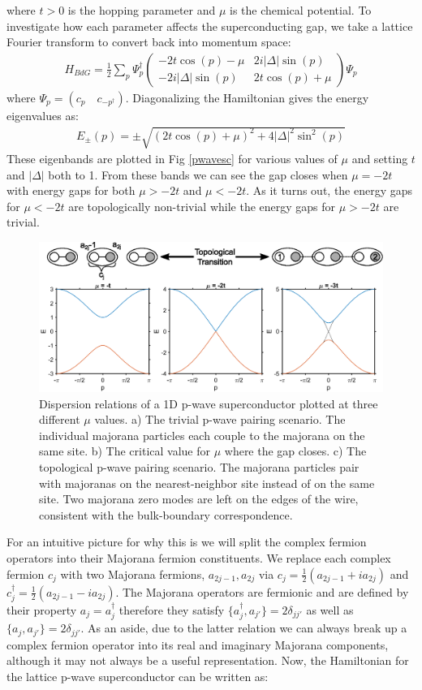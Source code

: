 where $t>0$ is the hopping parameter and $\mu$ is the chemical potential. To investigate how each parameter affects the superconducting gap, we take a lattice Fourier transform to convert back into momentum space:
\begin{align}
	H_{BdG} = \frac{1}{2}\sum_{p}\Psi_{p}^{\dagger}
	\begin{pmatrix}
		-2t\cos(p)-\mu & 2i|\Delta|\sin(p)\\
		-2i|\Delta|\sin(p) & 2t\cos(p)+\mu
	\end{pmatrix}
	\Psi_{p}
\end{align}
where $\Psi_{p}=(c_{p}\quad c_{-p^{\dagger}})$. Diagonalizing the Hamiltonian gives the energy eigenvalues as:
\begin{align}
	E_{\pm}(p) = \pm\sqrt{(2t\cos(p)+\mu)^{2}+4|\Delta|^{2}\sin^{2}(p)}
\end{align}
These eigenbands are plotted in Fig \ref{pwavesc} for various values of $\mu$ and setting $t$ and $|\Delta|$ both to 1. From these bands we can see the gap closes when $\mu=-2t$ with energy gaps for both $\mu>-2t$ and $\mu<-2t$. As it turns out, the energy gaps for $\mu < -2t$ are topologically non-trivial while the energy gaps for $\mu > -2t$ are trivial.
\begin{figure}
	\centering
	\includegraphics[width=\textwidth]{Intro/Figures/PWave_SC.eps}
	\caption{Dispersion relations of a 1D p-wave superconductor plotted at three different $\mu$ values. a) The trivial p-wave pairing scenario. The individual majorana particles each couple to the majorana on the same site. b) The critical value for $\mu$ where the gap closes. c) The topological p-wave pairing scenario. The majorana particles pair with majoranas on the nearest-neighbor site instead of on the same site. Two majorana zero modes are left on the edges of the wire, consistent with the bulk-boundary correspondence.}
	\label{fig:pwavesc}
\end{figure}
For an intuitive picture for why this is we will split the complex fermion operators into their Majorana fermion constituents. We replace each complex fermion $c_{j}$ with two Majorana fermions, $a_{2j-1},a_{2j}$ via $c_{j}=\frac{1}{2}(a_{2j-1}+ia_{2j})$ and $c_{j}^{\dagger}=\frac{1}{2}(a_{2j-1}-ia_{2j})$. The Majorana operators are fermionic and are defined by their property $a_{j}=a_{j}^{\dagger}$ therefore they satisfy $\{a_{j}^{\dagger},a_{j'}\}=2\delta_{jj'}$ as well as $\{a_{j},a_{j'}\}=2\delta_{jj'}$. As an aside, due to the latter relation we can always break up a complex fermion operator into its real and imaginary Majorana components, although it may not always be a useful representation. Now, the Hamiltonian for the lattice p-wave superconductor can be written as:
